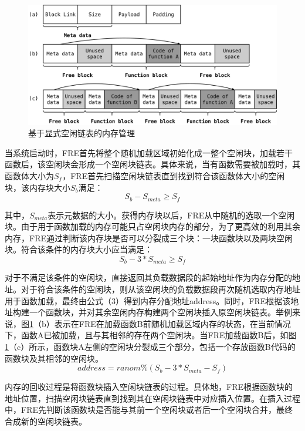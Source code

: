 \documentclass[12pt,a4paper]{ctexart}
\numberwithin{figure}{section}
\begin{document}
\begin{figure}[h]
    \centering
    \includegraphics[scale=0.3]{graph/memoryManagement.png}
    \caption{基于显式空闲链表的内存管理}
    \label{fig:memoryManagement}
\end{figure}
\par 当系统启动时，FRE首先将整个随机加载区域初始化成一整个空闲块，加载若干函数后，该空闲块会形成一个空闲块链表。具体来说，当有函数需要被加载时，其函数体大小为$S_f$​，FRE首先扫描空闲块链表直到找到符合该函数体大小的空闲块，该内存块大小$S_b$​满足：
\begin{equation}
    S_b-S_{meta}≥S_f \label{1}
\end{equation}
\par 其中，$S_{meta}$表示元数据的大小。获得内存块以后，FRE从中随机的选取一个空闲块。由于用于函数加载的内存可能只占空闲块内存的部分，为了更高效的利用其余内存，FRE通过判断该内存块是否可以分裂成三个块：一块函数块以及两块空闲块。符合该条件的内存块大小应当满足：
\begin{equation}
    S_b-3*S_{meta}≥S_f
\end{equation}
\par 对于不满足该条件的空闲块，直接返回其负载数据段的起始地址作为内存分配的地址。对于符合该条件的空闲块，则从该空闲块的负载数据段再次随机选取内存地址用于函数加载，最终由公式（3）得到内存分配地址address。同时，FRE根据该地址构建一个函数块，并对其余空闲内存构建两个空闲块插入原空闲块链表。举例来说，图\ref{fig:memoryManagement}（b）表示在FRE在加载函数B前随机加载区域内存的状态，在当前情况下，函数A已被加载，且与其相邻的存在两个空闲块。当FRE加载函数B后，如图\ref{fig:memoryManagement}（c）所示，函数块A左侧的空闲块分裂成三个部分，包括一个存放函数B代码的函数块及其相邻的空闲块。
\begin{equation}
    address=ranom\%(S_b-3*S_{meta}-S_f)
\end{equation}
\par 内存的回收过程是将函数块插入空闲块链表的过程。具体地，FRE根据函数块的地址位置，扫描空闲块链表直到找到其在空闲块链表中对应插入位置。在插入过程中，FRE先判断该函数块是否能与其前一个空闲块或者后一个空闲块合并，最终合成新的空闲块链表。
\end{document}
